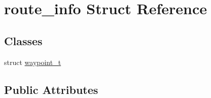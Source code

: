 \hypertarget{structroute__info}{\section{route\-\_\-info \-Struct \-Reference}
\label{structroute__info}
}
\subsection*{\-Classes}
\begin{DoxyCompactItemize}
\item 
struct \hyperlink{structroute__info_1_1waypoint__t}{waypoint\-\_\-t}
\end{DoxyCompactItemize}
\subsection*{\-Public \-Attributes}
